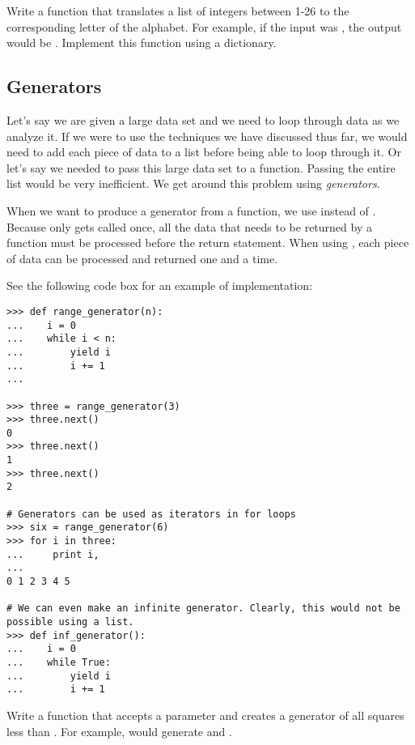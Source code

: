 \begin{problem}
Write a function that translates a list of integers between 1-26 to the corresponding letter of the alphabet. For example, if the input was \li{[1, 2, 3]}, the output would be \li{["a", "b", "c"]}. Implement this function using a dictionary. 
\end{problem}


\subsection*{Generators}

Let's say we are given a large data set and we need to loop through data as we analyze it. If we were to use the techniques we have discussed thus far, we would need to add each piece of data to a list before being able to loop through it. Or let's say we needed to pass this large data set to a function. Passing the entire list would be very inefficient. We get around this problem using \emph{generators}. 

When we want to produce a generator from a function, we use  instead of . Because  only gets called once, all the data that needs to be returned by a function must be processed before the return statement. When using , each piece of data can be processed and returned one and a time.

See the following code box for an example of implementation:

\begin{lstlisting}
>>> def range_generator(n):
...    i = 0
...    while i < n:
...        yield i 
...        i += 1
...

>>> three = range_generator(3)
>>> three.next()
0
>>> three.next()
1
>>> three.next()
2

# Generators can be used as iterators in for loops
>>> six = range_generator(6)
>>> for i in three:
...     print i,
...
0 1 2 3 4 5

# We can even make an infinite generator. Clearly, this would not be possible using a list.
>>> def inf_generator():
...    i = 0
...    while True:
...        yield i
...        i += 1

\end{lstlisting}

\begin{problem}
Write a function  that accepts a parameter  and creates a generator of all squares less than . For example,  would generate  and .
\end{problem}

